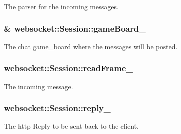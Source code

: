 The parser for the incoming messages. 

\subsubsection[{\texorpdfstring{game\+Board\+\_\+}{gameBoard_}}]{\& websocket\+::\+Session\+::game\+Board\+\_\+\hspace{0.3cm}{\ttfamily [private]}}\hypertarget{classwebsocket_1_1Session_add75c0a25f69839df5441997846b3f3e}{}\label{classwebsocket_1_1Session_add75c0a25f69839df5441997846b3f3e}


The chat game\+\_\+board where the messages will be posted. 

\subsubsection[{\texorpdfstring{read\+Frame\+\_\+}{readFrame_}}]{ websocket\+::\+Session\+::read\+Frame\+\_\+\hspace{0.3cm}{\ttfamily [private]}}\hypertarget{classwebsocket_1_1Session_a2ea49f75569589cc80cb9dbcfa7707ee}{}\label{classwebsocket_1_1Session_a2ea49f75569589cc80cb9dbcfa7707ee}


The incoming message. 

\subsubsection[{\texorpdfstring{reply\+\_\+}{reply_}}]{ websocket\+::\+Session\+::reply\+\_\+\hspace{0.3cm}{\ttfamily [private]}}\hypertarget{classwebsocket_1_1Session_a938563bfc401a7446f87a60acc642800}{}\label{classwebsocket_1_1Session_a938563bfc401a7446f87a60acc642800}


The http Reply to be sent back to the client. 

